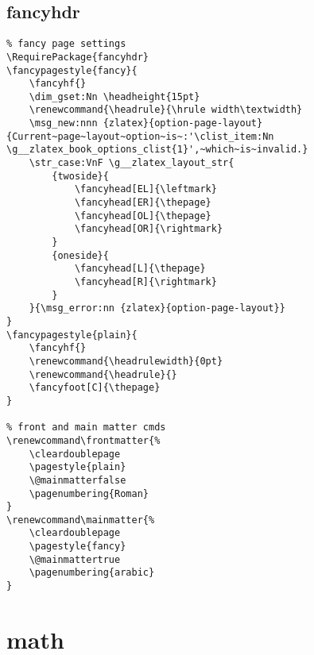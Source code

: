 \subsection{fancyhdr}
\begin{verbatim}
% fancy page settings
\RequirePackage{fancyhdr}
\fancypagestyle{fancy}{
    \fancyhf{}  
    \dim_gset:Nn \headheight{15pt}
    \renewcommand{\headrule}{\hrule width\textwidth}
    \msg_new:nnn {zlatex}{option-page-layout}{Current~page~layout~option~is~:'\clist_item:Nn \g__zlatex_book_options_clist{1}',~which~is~invalid.}
    \str_case:VnF \g__zlatex_layout_str{
        {twoside}{
            \fancyhead[EL]{\leftmark}
            \fancyhead[ER]{\thepage}
            \fancyhead[OL]{\thepage}
            \fancyhead[OR]{\rightmark}
        }
        {oneside}{
            \fancyhead[L]{\thepage}
            \fancyhead[R]{\rightmark}
        }
    }{\msg_error:nn {zlatex}{option-page-layout}}
}
\fancypagestyle{plain}{
    \fancyhf{}  
    \renewcommand{\headrulewidth}{0pt}
    \renewcommand{\headrule}{}
    \fancyfoot[C]{\thepage}
}

% front and main matter cmds
\renewcommand\frontmatter{%
    \cleardoublepage
    \pagestyle{plain}
    \@mainmatterfalse
    \pagenumbering{Roman}
}
\renewcommand\mainmatter{%
    \cleardoublepage
    \pagestyle{fancy}
    \@mainmattertrue
    \pagenumbering{arabic}
}
\end{verbatim}


\section{math}
